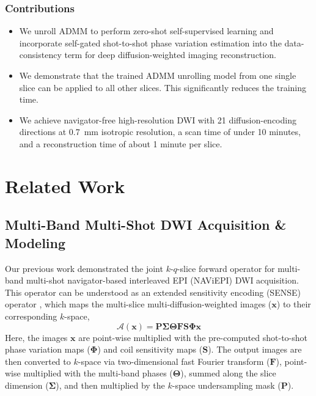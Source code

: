 \documentclass[journal,twoside,web]{ieeecolor}
\begin{document}
	\subsubsection*{Contributions}
	\begin{itemize}
		\item We unroll ADMM to perform zero-shot self-supervised learning 
		and incorporate self-gated shot-to-shot phase variation estimation 
		into the data-consistency term for deep diffusion-weighted imaging reconstruction.
		\item We demonstrate that the trained ADMM unrolling model from one single slice 
		can be applied to all other slices. 
		This significantly reduces the training time.
		\item We achieve navigator-free high-resolution DWI with 21 diffusion-encoding
		directions at \SI{0.7}{\milli\meter} isotropic resolution,
		a scan time of under 10 minutes, and a reconstruction time of about 1 minute per slice.
	\end{itemize}


	\section{Related Work}


	\subsection{Multi-Band Multi-Shot DWI Acquisition \& Modeling} \label{SEC:FWD}

	Our previous work \cite{tan_2024_naviepi} demonstrated
	the joint $k$-$q$-slice forward operator
	for multi-band multi-shot navigator-based interleaved EPI (NAViEPI) DWI acquisition.
	This operator can be understood as
	an extended sensitivity encoding (SENSE) operator \cite{pruessmann_2001_gsense},
	which maps the multi-slice multi-diffusion-weighted images ($\mathbf{x}$)
	to their corresponding $k$-space,
	\begin{equation}
		\mathcal{A}(\mathbf{x}) = \mathbf{P \Sigma \Theta F S \Phi} \mathbf{x}
		\label{EQU:FWD}
	\end{equation}
	Here, the images $\mathbf{x}$ are point-wise multiplied
	with the pre-computed shot-to-shot phase variation maps ($\mathbf{\Phi}$)
	and coil sensitivity maps ($\mathbf{S}$).
	The output images are then converted to $k$-space
	via two-dimensional fast Fourier transform ($\mathbf{F}$),
	point-wise multiplied with the multi-band phases ($\mathbf{\Theta}$),
	summed along the slice dimension ($\mathbf{\Sigma}$),
	and then multiplied by the $k$-space undersampling mask ($\mathbf{P}$).
\end{document}
